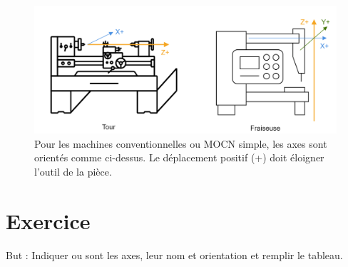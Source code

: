 \documentclass[
	11pt, %
	fleqn, %
	a4paper, %
]{LegrandOrangeBook}
\begin{document}
\begin{figure}[H] %
	\centering %
	\includegraphics[width=1.1\textwidth]{Images/axe2.png} %
	\caption{Pour les machines conventionnelles ou MOCN simple, les axes sont orientés comme ci-dessus. Le déplacement positif (+) doit éloigner l'outil de la pièce.}
	\label{Axes_2} %
\end{figure}





\section*{Exercice}
But : Indiquer ou sont les axes, leur nom et orientation et remplir le tableau.
\begin{figure}[H] %
	\centering %
	\label{Exo_1} %
\end{figure}
\end{document}
